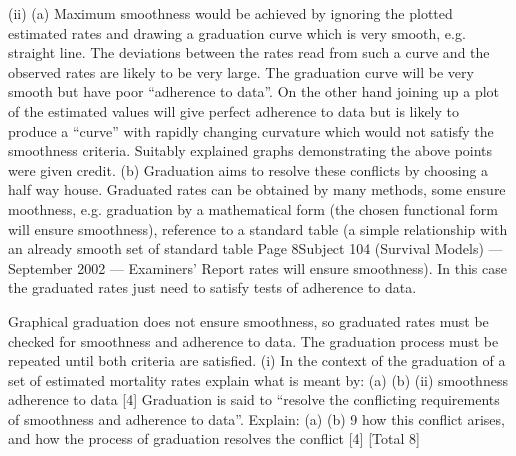 \documentclass[a4paper,12pt]{article}
\begin{document}
(ii)
(a)
Maximum smoothness would be achieved by ignoring the plotted estimated rates and drawing a graduation curve which is very smooth, e.g. straight line. The deviations between the rates read from such a
curve and the observed rates are likely to be very large. The graduation curve will be very smooth but have poor “adherence to data”.
On the other hand joining up a plot of the estimated values will give perfect adherence to data but is likely to produce a “curve” with
rapidly changing curvature which would not satisfy the smoothness criteria.
Suitably explained graphs demonstrating the above points were given credit.
(b)
Graduation aims to resolve these conflicts by choosing a half way
house.
Graduated rates can be obtained by many methods, some ensure moothness, e.g. graduation by a mathematical form (the chosen
functional form will ensure smoothness), reference to a standard table
(a simple relationship with an already smooth set of standard table
Page 8Subject 104 (Survival Models) — September 2002 — Examiners’ Report
rates will ensure smoothness). In this case the graduated rates just
need to satisfy tests of adherence to data.

Graphical graduation does not ensure smoothness, so graduated rates must be checked for smoothness and adherence to data. The
graduation process must be repeated until both criteria are satisfied.
(i)
In the context of the graduation of a set of estimated mortality rates explain
what is meant by:
(a)
(b)
(ii)
smoothness
adherence to data
[4]
Graduation is said to “resolve the conflicting requirements of smoothness and
adherence to data”.
Explain:
(a)
(b)
9
how this conflict arises, and
how the process of graduation resolves the conflict
[4]
[Total 8]
\end{document}
